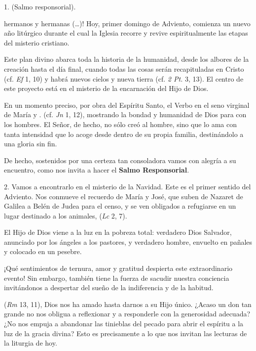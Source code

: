 \begin{body}
	1.  (Salmo responsorial). 
	
	 hermanos y hermanas (\ldots{})! Hoy, primer domingo de Adviento, comienza un nuevo año litúrgico durante el cual la Iglesia recorre y revive espiritualmente las etapas del misterio cristiano. 
	
	Este plan divino abarca toda la historia de la humanidad, desde los albores de la creación hasta el día final, cuando todas las cosas serán recapituladas en Cristo (cf. \emph{Ef} 1, 10) y habrá nuevos cielos y nueva tierra (cf. \emph{2 Pt.} 3, 13). El centro de este proyecto está en el misterio de la encarnación del Hijo de Dios. 
	
	En un momento preciso, por obra del Espíritu Santo, el Verbo  en el seno virginal de María y . (cf. \emph{Jn} 1, 12), mostrando la bondad y humanidad de Dios para con los hombres. El Señor, de hecho, no sólo creó al hombre, sino que lo ama con tanta intensidad que lo acoge desde dentro de su propia familia, destinándolo a una gloria sin fin. 
	
	De hecho, sostenidos por una certeza tan consoladora vamos con alegría a su encuentro, como nos invita a hacer el \textbf{Salmo Responsorial}. 
	
	2. Vamos a encontrarlo en el misterio de la Navidad. Este es el primer sentido del Adviento. Nos conmueve el recuerdo de María y José, que suben de Nazaret de Galilea a Belén de Judea para el censo, y se ven obligados a refugiarse en un lugar destinado a los animales,  (\emph{Lc} 2, 7). 
	
	El Hijo de Dios viene a la luz en la pobreza total: verdadero Dios Salvador, anunciado por los ángeles a los pastores, y verdadero hombre, envuelto en pañales y colocado en un pesebre. 
	
	¡Qué sentimientos de ternura, amor y gratitud despierta este extraordinario evento! Sin embargo, también tiene la fuerza de sacudir nuestra conciencia invitándonos a despertar del sueño de la indiferencia y de la habitud. 
	
	 (\emph{Rm} 13, 11), Dios nos ha amado hasta darnos a su Hijo único. ¿Acaso un don tan grande no nos obligua a reflexionar y a responderle con la generosidad adecuada? ¿No nos empuja a abandonar las tinieblas del pecado para abrir el espíritu a la luz de la gracia divina? Esto es precisamente a lo que nos invitan las lecturas de la liturgia de hoy. 
	

\end{body}
